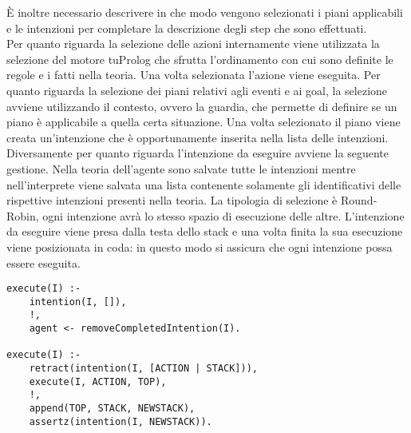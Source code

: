 \`E inoltre necessario descrivere in che modo vengono selezionati i piani applicabili e le intenzioni per completare la descrizione degli step che sono effettuati.
\\
Per quanto riguarda la selezione delle azioni internamente viene utilizzata la selezione del motore tuProlog che sfrutta l'ordinamento con cui sono definite le regole e i fatti nella teoria. Una volta selezionata l'azione viene eseguita.
Per quanto riguarda la selezione dei piani relativi agli eventi e ai goal, la selezione avviene utilizzando il contesto, ovvero la guardia, che permette di definire se un piano è applicabile a quella certa situazione.
Una volta selezionato il piano viene creata un'intenzione che è opportunamente inserita nella lista delle intenzioni.
\\
Diversamente per quanto riguarda l'intenzione da eseguire avviene la seguente gestione.
Nella teoria dell'agente sono salvate tutte le intenzioni mentre nell'interprete viene salvata una lista contenente solamente gli identificativi delle rispettive intenzioni presenti nella teoria. La tipologia di selezione è Round-Robin, ogni intenzione avrà lo stesso spazio di esecuzione delle altre. L'intenzione da eseguire viene presa dalla testa dello stack e una volta finita la sua esecuzione viene posizionata in coda: in questo modo si assicura che ogni intenzione possa essere eseguita.

\medskip
\begin{lstlisting}[firstnumber=1,label={lst:ImplementazioneRegoleInvocazioneEsecuzioneIntenzione},caption={Implementazione regole per invocazione esecuzione di un'intenzione}]
execute(I) :-
    intention(I, []),
    !,
    agent <- removeCompletedIntention(I).

execute(I) :-
    retract(intention(I, [ACTION | STACK])),
    execute(I, ACTION, TOP),
    !,
    append(TOP, STACK, NEWSTACK),
    assertz(intention(I, NEWSTACK)).
\end{lstlisting}

